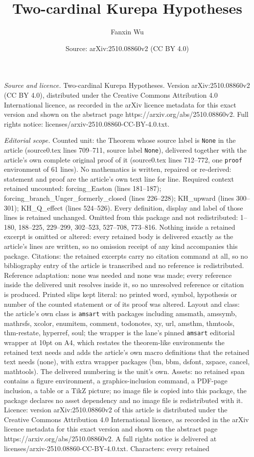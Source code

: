 \documentclass[10pt,a4paper]{amsart}
\title[Two-cardinal Kurepa Hypotheses]{Two-cardinal Kurepa Hypotheses}
\author{Fanxin Wu}
\date{Source: arXiv:2510.08860v2 (CC BY 4.0)}
\begin{document}
\maketitle

\noindent\emph{Source and licence.} Two-cardinal Kurepa Hypotheses. Version arXiv:2510.08860v2 (CC BY 4.0), distributed under the Creative Commons Attribution 4.0 International licence, as recorded in the arXiv licence metadata for this exact version and shown on the abstract page https://arxiv.org/abs/2510.08860v2. Full rights notice: licenses/arxiv-2510.08860-CC-BY-4.0.txt.\par\smallskip

\noindent\textit{Editorial scope.} Counted unit: the Theorem whose source label is \texttt{None} in the article (source0.tex lines 709--711, source label \texttt{None}), delivered together with the article's own complete original proof of it (source0.tex lines 712--772, one \texttt{proof} environment of 61 lines). No mathematics is written, repaired or re-derived: statement and proof are the article's own text line for line. Required context retained uncounted: forcing\_Easton (lines 181--187); forcing\_branch\_Unger\_formerly\_closed (lines 226--228); KH\_upward (lines 300--301); KH\_Q\_effect (lines 524--526). Every definition, display and label of those lines is retained unchanged. Omitted from this package and not redistributed: 1--180, 188--225, 229--299, 302--523, 527--708, 773--816. Nothing inside a retained excerpt is omitted or altered: every retained body is delivered exactly as the article's lines are written, so no omission receipt of any kind accompanies this package. Citations: the retained excerpts carry no citation command at all, so no bibliography entry of the article is transcribed and no reference is redistributed. Reference adaptation: none was needed and none was made; every reference inside the delivered unit resolves inside it, so no unresolved reference or citation is produced. Printed slips kept literal: no printed word, symbol, hypothesis or number of the counted statement or of its proof was altered. Layout and class: the article's own class is \texttt{amsart} with packages including amsmath, amssymb, mathrsfs, xcolor, enumitem, comment, todonotes, xy, url, amsthm, thmtools, thm-restate, hyperref, soul; the wrapper is the lane's pinned \texttt{amsart} editorial wrapper at 10pt on A4, which restates the theorem-like environments the retained text needs and adds the article's own macro definitions that the retained text needs (none), with extra wrapper packages (bm, bbm, dsfont, xspace, cancel, mathtools). The delivered numbering is the unit's own. Assets: no retained span contains a figure environment, a graphics-inclusion command, a PDF-page inclusion, a table or a TikZ picture; no image file is copied into this package, the package declares no asset dependency and no image file is redistributed with it. Licence: version arXiv:2510.08860v2 of this article is distributed under the Creative Commons Attribution 4.0 International licence, as recorded in the arXiv licence metadata for this exact version and shown on the abstract page https://arxiv.org/abs/2510.08860v2. A full rights notice is delivered at licenses/arxiv-2510.08860-CC-BY-4.0.txt. Characters: every retained 
\end{document}

